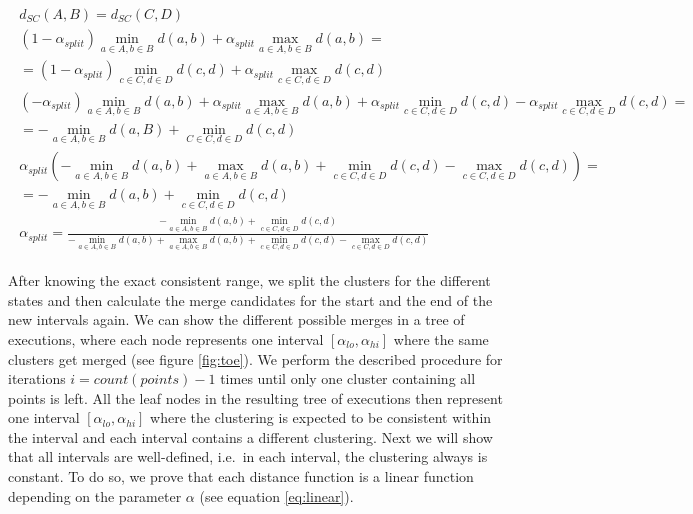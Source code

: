 \begin{equation}
    \begin{aligned}
        \begin{gathered}
        d_{SC}(A,B) = d_{SC}(C,D)\\
        (1 - \alpha_{split}) \min\limits_{a \in A, b \in B} d(a,b) + \alpha_{split} \max\limits_{a \in A, b \in B} d(a,b) = \\
        = (1 - \alpha_{split}) \min\limits_{c \in C, d \in D} d(c,d) + \alpha_{split} \max\limits_{c \in C, d \in D} d(c,d)\\
        (- \alpha_{split}) \min\limits_{a \in A, b \in B} d(a,b) + \alpha_{split} \max\limits_{a \in A, b \in B} d(a,b) + \alpha_{split} \min\limits_{c \in C, d \in D} d(c,d) - \alpha_{split} \max\limits_{c \in C, d \in D} d(c,d) =\\
        = - \min\limits_{a \in A, b \in B} d(a,B) + \min\limits_{C \in C, d \in D} d(c,d)\\
        \alpha_{split} (- \min\limits_{a \in A, b \in B} d(a,b) + \max\limits_{a \in A, b \in B} d(a,b) + \min\limits_{c \in C, d \in D} d(c,d) - \max\limits_{c \in C, d \in D} d(c,d)) =\\
        = - \min\limits_{a \in A, b \in B} d(a,b) + \min\limits_{c \in C, d \in D} d(c,d)\\
        \alpha_{split} = \frac{- \min\limits_{a \in A, b \in B} d(a,b) + \min\limits_{c \in C, d \in D} d(c,d)}{- \min\limits_{a \in A, b \in B} d(a,b) + \max\limits_{a \in A, b \in B} d(a,b) + \min\limits_{c \in C, d \in D} d(c,d) - \max\limits_{c \in C, d \in D} d(c,d)}
    \end{gathered}
    \end{aligned}
    \label{eq:equalizesc}
\end{equation}

After knowing the exact consistent range, we split the clusters for the different states and then calculate the merge candidates for the start and the end of the new intervals again. We can show the different possible merges in a tree of executions, where each node represents one interval $[\alpha_{lo}, \alpha_{hi}]$ where the same clusters get merged (see figure \ref{fig:toe}). We perform the described procedure for iterations $i = count(points) -1$ times until only one cluster containing all points is left. All the leaf nodes in the resulting tree of executions then represent one interval $[\alpha_{lo}, \alpha_{hi}]$ where the clustering is expected to be consistent within the interval and each interval contains a different clustering. Next we will show that all intervals are well-defined, i.e.\ in each interval, the clustering always is constant. To do so, we prove that each distance function is a linear function depending on the parameter $\alpha$ (see equation \ref{eq:linear}).

